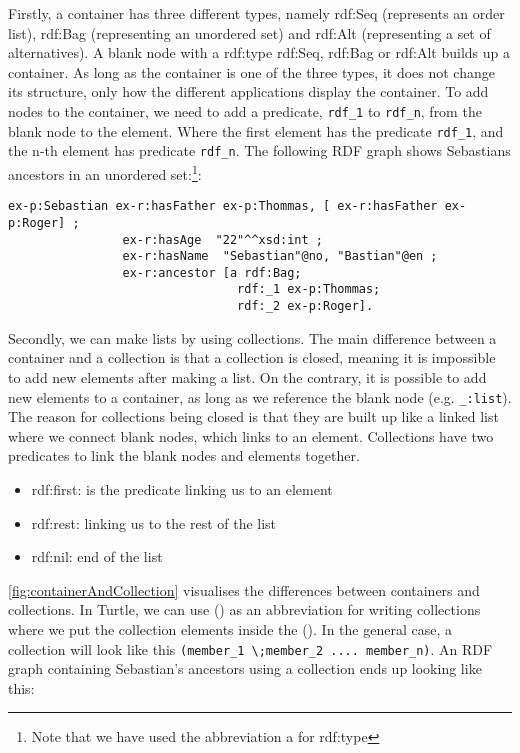 \para
Firstly, a container has three different types, namely rdf:Seq (represents an order list), rdf:Bag (representing an unordered set) and rdf:Alt (representing a set of alternatives). A blank node with a rdf:type rdf:Seq, rdf:Bag or rdf:Alt builds up a container. As long as the container is one of the three types, it does not change its structure, only how the different applications display the container. To add nodes to the container, we need to add a predicate, \lstinline{rdf_1} to \lstinline{rdf_n}, from the blank node to the element. Where the first element has the predicate \lstinline{rdf_1}, and the n-th element has predicate \lstinline{rdf_n}. The following RDF graph shows Sebastians ancestors in an unordered set:\footnote{Note that we have used the abbreviation a for rdf:type}:
\begin{lstlisting}[frame=single, language=turtle]
ex-p:Sebastian ex-r:hasFather ex-p:Thommas, [ ex-r:hasFather ex-p:Roger] ; 
                ex-r:hasAge  "22"^^xsd:int ; 
                ex-r:hasName  "Sebastian"@no, "Bastian"@en ;
                ex-r:ancestor [a rdf:Bag; 
                                rdf:_1 ex-p:Thommas; 
                                rdf:_2 ex-p:Roger].
\end{lstlisting}
Secondly, we can make lists by using collections. The main difference between a container and a collection is that a collection is closed, meaning it is impossible to add new elements after making a list. On the contrary, it is possible to add new elements to a container, as long as we reference the blank node (e.g. \lstinline{_:list}). The reason for collections being closed is that they are built up like a linked list where we connect blank nodes, which links to an element. Collections have two predicates to link the blank nodes and elements together. 

\begin{itemize}
    \item rdf:first: is the predicate linking us to an element
    \item rdf:rest: linking us to the rest of the list
    \item rdf:nil: end of the list
\end{itemize}
\autoref{fig:containerAndCollection} visualises the differences between containers and collections. In Turtle, we can use () as an abbreviation for writing collections where we put the collection elements inside the (). In the general case, a collection will look like this \lstinline{(member_1 \;member_2 .... member_n)}. An RDF graph containing Sebastian's ancestors using a collection ends up looking like this:

